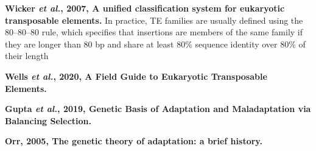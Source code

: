 \documentclass[11pt]{article}
\begin{document}
\begin{sloppypar}
\par
\textbf{Wicker \textit{et al.}, 2007, A unified classification system for eukaryotic transposable elements.} \newline
In practice, TE families are usually defined using the 80–80–80 rule, which specifies that insertions are members of the same family if they are longer than 80 bp and share at least 80\% sequence identity over 80\% of their length
\par
\textbf{Wells \textit{et al.}, 2020, A Field Guide to Eukaryotic Transposable Elements.} \newline
\par
\textbf{Gupta \textit{et al.}, 2019, Genetic Basis of Adaptation and Maladaptation via Balancing Selection.} \newline
\par
\textbf{Orr, 2005, The genetic theory of adaptation: a brief history.} \newline
\par


\end{sloppypar}
\end{document}
